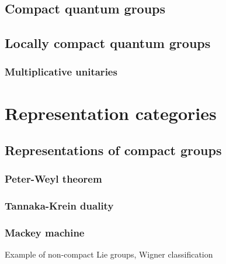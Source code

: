 \documentclass{../../large}
\begin{document}
\chapter{Compact quantum groups}


\chapter{Locally compact quantum groups}
\section{Multiplicative unitaries}


\part{Representation categories}


\chapter{Representations of compact groups}
\section{Peter-Weyl theorem}
\section{Tannaka-Krein duality}
\section{Mackey machine}
Example of non-compact Lie groups,
Wigner classification
\end{document}
